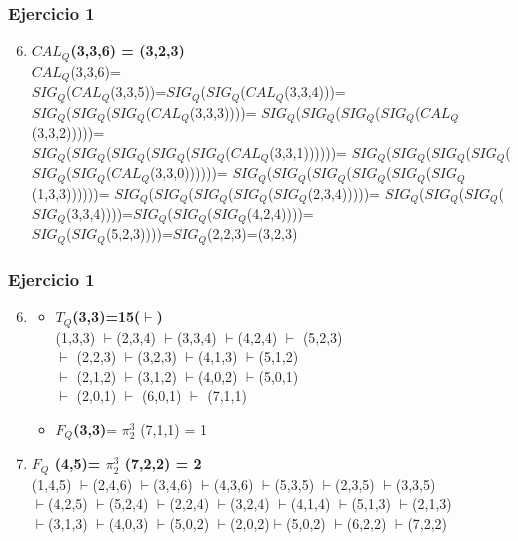 \documentclass[xcolor=table]{beamer}
\begin{document}
\begin{frame}  \frametitle{Ejercicio 1}

\begin{enumerate}
\setcounter{enumi}{5}
    \item \textbf{$CAL_Q$(3,3,6) = (3,2,3)} \\
    $CAL_Q$(3,3,6)= \\
$SIG_Q$($CAL_Q$(3,3,5))=$SIG_Q$($SIG_Q$($CAL_Q$(3,3,4)))= \\
$SIG_Q$($SIG_Q$($SIG_Q$($CAL_Q$(3,3,3))))= $SIG_Q$($SIG_Q$($SIG_Q$($SIG_Q$($CAL_Q$(3,3,2)))))=\\ $SIG_Q$($SIG_Q$($SIG_Q$($SIG_Q$($SIG_Q$($CAL_Q$(3,3,1))))))= $SIG_Q$($SIG_Q$($SIG_Q$($SIG_Q$($SIG_Q$($SIG_Q$($CAL_Q$(3,3,0))))))= $SIG_Q$($SIG_Q$($SIG_Q$($SIG_Q$($SIG_Q$($SIG_Q$(1,3,3))))))= $SIG_Q$($SIG_Q$($SIG_Q$($SIG_Q$($SIG_Q$(2,3,4)))))= $SIG_Q$($SIG_Q$($SIG_Q$($SIG_Q$(3,3,4))))=$SIG_Q$($SIG_Q$($SIG_Q$(4,2,4))))= \\
$SIG_Q$($SIG_Q$(5,2,3))))=$SIG_Q$(2,2,3)=(3,2,3)

\end{enumerate}

\end{frame} 

\begin{frame}  \frametitle{Ejercicio 1}

\begin{enumerate}
\setcounter{enumi}{5}
    \item 
    \begin{itemize}
    \item \textbf{$T_Q$(3,3)=15($\vdash$)} \\
(1,3,3) $\vdash$(2,3,4) $\vdash$(3,3,4) $\vdash$(4,2,4) $\vdash$ (5,2,3)\\ 
$\vdash$ (2,2,3) $\vdash$(3,2,3) $\vdash$(4,1,3) $\vdash$(5,1,2)\\ 
$\vdash$ (2,1,2) $\vdash$(3,1,2) $\vdash$(4,0,2) $\vdash$(5,0,1)\\ 
$\vdash$ (2,0,1) $\vdash$ (6,0,1) $\vdash$ (7,1,1) \\
  \item \textbf{$F_Q$(3,3)}= $\pi^3_2$ (7,1,1) = 1

    \end{itemize}
  \item \textbf{$F_Q$ (4,5)= $\pi^3_2$ (7,2,2) = 2}\\ 
  (1,4,5) $\vdash$(2,4,6) $\vdash$(3,4,6) $\vdash$(4,3,6) $\vdash$(5,3,5) $\vdash$(2,3,5) $\vdash$(3,3,5) \\
  $\vdash$(4,2,5) $\vdash$(5,2,4) $\vdash$(2,2,4) $\vdash$(3,2,4) $\vdash$(4,1,4) $\vdash$(5,1,3) $\vdash$(2,1,3) \\
  $\vdash$(3,1,3) $\vdash$(4,0,3) $\vdash$(5,0,2) $\vdash$(2,0,2)$\vdash$(5,0,2) $\vdash$(6,2,2) $\vdash$(7,2,2) 

\end{enumerate}

\end{frame} 
\end{document}
